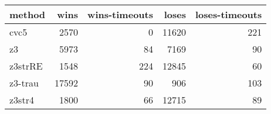 \begin{tabular}{lrrrr}
\hline
 method   &   wins &   wins-timeouts &   loses &   loses-timeouts \\
\hline
 cvc5     &   2570 &               0 &   11620 &              221 \\
 z3       &   5973 &              84 &    7169 &               90 \\
 z3strRE  &   1548 &             224 &   12845 &               60 \\
 z3-trau  &  17592 &              90 &     906 &              103 \\
 z3str4   &   1800 &              66 &   12715 &               89 \\
\hline
\end{tabular}
